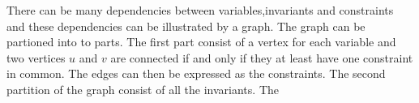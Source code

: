 There can be many dependencies between variables,invariants and constraints and these dependencies can be illustrated 
by a graph. The graph can be partioned into to parts. The first part consist of a vertex for each variable and two 
vertices $u$ and $v$ are connected if and only if they at least have one constraint in common. The edges can then be 
expressed as the constraints. The second partition of the graph consist of all the invariants. The  
  
